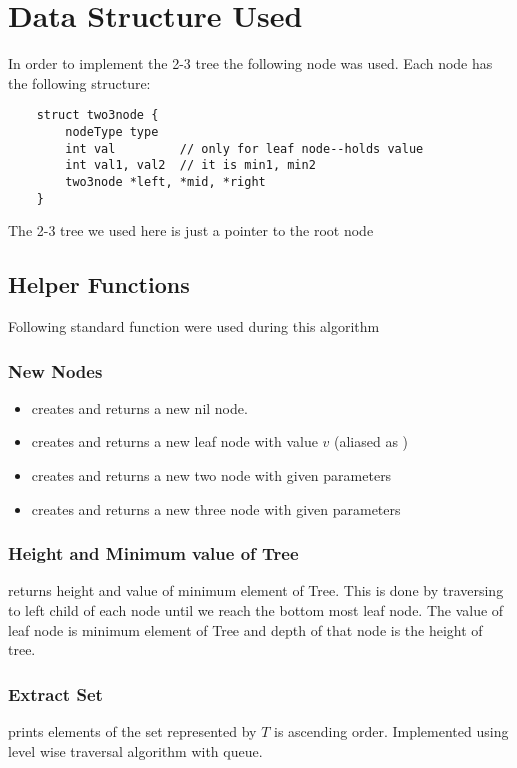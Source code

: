 \section{Data Structure Used}
\justifying
\par
In order to implement the 2-3 tree the following node was used. Each node has the following structure:

\begin{lstlisting}
    struct two3node {
    	nodeType type
    	int val         // only for leaf node--holds value
    	int val1, val2  // it is min1, min2
    	two3node *left, *mid, *right
    }
\end{lstlisting}
The 2-3 tree we used here is just a pointer to the root node
\subsection{Helper Functions}
Following standard function were used during this algorithm
\subsubsection{New Nodes}
\begin{itemize}
    \item {} creates and returns a new nil node.
    \item {} creates and returns a new leaf node with value $v$ (aliased as )
    \item {}  creates and returns a new two node with given parameters 
    \item {} creates and returns a new three node with given parameters
\end{itemize}

\subsubsection{Height and Minimum value of Tree}
 returns height and value of minimum element of Tree. This is done by traversing to left child of each node until we reach the bottom most leaf node. The value of leaf node is minimum element of Tree and depth of that node is the height of tree.


\subsubsection{Extract Set}
 prints elements of the set represented by $T$ is ascending order. Implemented using level wise traversal algorithm with queue.
